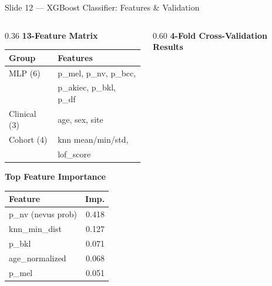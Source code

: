 \documentclass[aspectratio=169, 9pt]{beamer}
\begin{document}
\begin{frame}{Slide 12 --- XGBoost Classifier: Features \& Validation}

  \begin{columns}[T]

    \begin{column}{0.36\textwidth}
      \textbf{\color{navyblue}13-Feature Matrix}

      \vspace{0.3em}
      {\small
      \begin{tabular}{@{} ll @{}}
        \toprule
        Group & Features \\
        \midrule
        MLP (6)     & p\_mel, p\_nv, p\_bcc, \\
                    & p\_akiec, p\_bkl, p\_df \\
        Clinical (3)& age, sex, site \\
        Cohort (4)  & knn mean/min/std, \\
                    & lof\_score \\
        \bottomrule
      \end{tabular}
      }

      \vspace{0.5em}
      \textbf{\color{navyblue}Top Feature Importance}

      \vspace{0.3em}
      {\small
      \begin{tabular}{@{} l r @{}}
        \toprule
        Feature & Imp. \\
        \midrule
        p\_nv (nevus prob)  & 0.418 \\
        knn\_min\_dist      & 0.127 \\
        p\_bkl              & 0.071 \\
        age\_normalized     & 0.068 \\
        p\_mel              & 0.051 \\
        \bottomrule
      \end{tabular}
      }
    \end{column}

    \begin{column}{0.60\textwidth}
      \textbf{\color{navyblue}4-Fold Cross-Validation Results}


\end{column}
\end{columns}
\end{frame}
\end{document}
